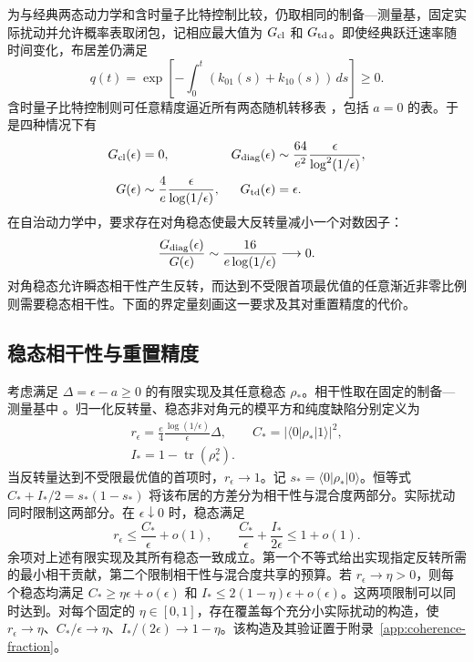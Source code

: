 \documentclass[aps,pra,reprint,amsmath,amssymb,nofootinbib,floatfix,longbibliography]{revtex4-2}
\theoremstyle{aps}
\DeclareMathOperator{\tr}{tr}
\newcommand{\eps}{\epsilon}
\newcommand{\ket}[1]{|#1\rangle}
\newcommand{\bra}[1]{\langle#1|}
\begin{document}
为与经典两态动力学和含时量子比特控制比较，仍取相同的制备—测量基，固定实际扰动并允许概率表取闭包，记相应最大值为 $G_{\rm cl}$ 和 $G_{\rm td}$。即使经典跃迁速率随时间变化，布居差仍满足
\[
q(t)=\exp\!\left[-\int_0^t(k_{01}(s)+k_{10}(s))\,ds\right]\ge0.
\]
含时量子比特控制则可任意精度逼近所有两态随机转移表 \cite{KorzekwaLostaglio2021}，包括 $a=0$ 的表。于是四种情况下有
\begin{equation}\label{eq:three}
 \begin{aligned}
 G_{\rm cl}(\eps)&=0,&
 G_{\rm diag}(\eps)&\sim\frac{64}{e^2}\frac{\eps}{\log^2(1/\eps)},\\
 G(\eps)&\sim\frac4e\frac{\eps}{\log(1/\eps)},&
 G_{\rm td}(\eps)&=\eps.
 \end{aligned}
\end{equation}
在自治动力学中，要求存在对角稳态使最大反转量减小一个对数因子：
\begin{equation}\label{eq:ratio}
 \frac{G_{\rm diag}(\eps)}{G(\eps)}
 \sim\frac{16}{e\log(1/\eps)}\longrightarrow0.
\end{equation}
对角稳态允许瞬态相干性产生反转，而达到不受限首项最优值的任意渐近非零比例则需要稳态相干性。下面的界定量刻画这一要求及其对重置精度的代价。



\subsection{稳态相干性与重置精度}

考虑满足 $\Delta=\eps-a\ge0$ 的有限实现及其任意稳态 $\rho_*$。相干性取在固定的制备—测量基中 \cite{Baumgratz2014}。归一化反转量、稳态非对角元的模平方和纯度缺陷分别定义为
\begin{equation}\label{eq:resource-definitions}
 \begin{gathered}
 r_\eps=\frac e4\frac{\log(1/\eps)}\eps\Delta,\qquad
 C_*=|\bra0\rho_*\ket1|^2,\\
 I_*=1-\tr(\rho_*^2).
 \end{gathered}
\end{equation}
当反转量达到不受限最优值的首项时，$r_\eps\to1$。记 $s_*=\bra0\rho_*\ket0$。恒等式 $C_*+I_*/2=s_*(1-s_*)$ 将该布居的方差分为相干性与混合度两部分。实际扰动同时限制这两部分。在 $\eps\downarrow0$ 时，稳态满足
\begin{equation}\label{eq:coherence-fraction}
 r_\eps\le\frac{C_*}{\eps}+o(1),\qquad
 \frac{C_*}{\eps}+\frac{I_*}{2\eps}\le1+o(1).
\end{equation}
余项对上述有限实现及其所有稳态一致成立。第一个不等式给出实现指定反转所需的最小相干贡献，第二个限制相干性与混合度共享的预算。若 $r_\eps\to\eta>0$，则每个稳态均满足 $C_*\ge\eta\eps+o(\eps)$ 和 $I_*\le2(1-\eta)\eps+o(\eps)$。这两项限制可以同时达到。对每个固定的 $\eta\in[0,1]$，存在覆盖每个充分小实际扰动的构造，使 $r_\eps\to\eta$、$C_*/\eps\to\eta$、$I_*/(2\eps)\to1-\eta$。该构造及其验证置于附录~\ref{app:coherence-fraction}。
\end{document}
